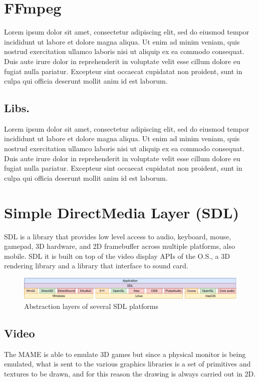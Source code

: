 \section{FFmpeg}
Lorem ipsum dolor sit amet, consectetur adipiscing elit, sed do eiusmod tempor incididunt ut labore et dolore magna aliqua. Ut enim ad minim veniam, quis nostrud exercitation ullamco laboris nisi ut aliquip ex ea commodo consequat. Duis aute irure dolor in reprehenderit in voluptate velit esse cillum dolore eu fugiat nulla pariatur. Excepteur sint occaecat cupidatat non proident, sunt in culpa qui officia deserunt mollit anim id est laborum\cite{FFmpeg_Documentation}.

\subsection{Libs.}
Lorem ipsum dolor sit amet, consectetur adipiscing elit, sed do eiusmod tempor incididunt ut labore et dolore magna aliqua. Ut enim ad minim veniam, quis nostrud exercitation ullamco laboris nisi ut aliquip ex ea commodo consequat. Duis aute irure dolor in reprehenderit in voluptate velit esse cillum dolore eu fugiat nulla pariatur. Excepteur sint occaecat cupidatat non proident, sunt in culpa qui officia deserunt mollit anim id est laborum.



\section{Simple DirectMedia Layer (SDL)}
SDL is a library that provides low level access to audio, keyboard, mouse, gamepad, 3D hardware, and 2D framebuffer across multiple platforms, also mobile. SDL it is built on top of the video display APIs of the O.S., a 3D rendering library and a library that interface to sound card\cite{SDL_Wiki}.

\begin{figure}[H]
	\includegraphics[width=\linewidth]{immagini/sdl}
	\caption{Abstraction layers of several SDL platforms}
	\label{fig:sdl}
\end{figure}

\subsection{Video}
The MAME is able to emulate 3D games but since a physical monitor is being emulated, what is sent to the various graphics libraries is a set of primitives and textures to be drawn, and for this reason the drawing is always carried out in 2D.

